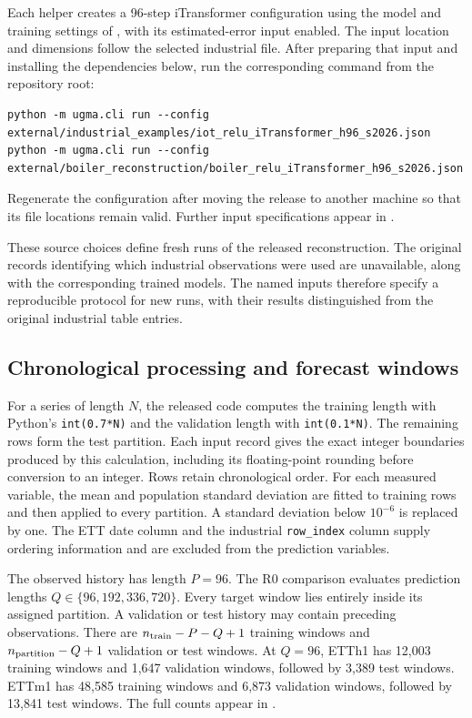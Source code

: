 Each helper creates a 96-step iTransformer configuration using the model and training settings of , with its estimated-error input enabled. The input location and dimensions follow the selected industrial file. After preparing that input and installing the dependencies below, run the corresponding command from the repository root:
\begin{lstlisting}
python -m ugma.cli run --config external/industrial_examples/iot_relu_iTransformer_h96_s2026.json
python -m ugma.cli run --config external/boiler_reconstruction/boiler_relu_iTransformer_h96_s2026.json
\end{lstlisting}
Regenerate the configuration after moving the release to another machine so that its file locations remain valid. Further input specifications appear in .

These source choices define fresh runs of the released reconstruction. The original records identifying which industrial observations were used are unavailable, along with the corresponding trained models. The named inputs therefore specify a reproducible protocol for new runs, with their results distinguished from the original industrial table entries.

\subsection*{Chronological processing and forecast windows}
For a series of length $N$, the released code computes the training length with Python's \texttt{int(0.7*N)} and the validation length with \texttt{int(0.1*N)}. The remaining rows form the test partition. Each input record gives the exact integer boundaries produced by this calculation, including its floating-point rounding before conversion to an integer. Rows retain chronological order. For each measured variable, the mean and population standard deviation are fitted to training rows and then applied to every partition. A standard deviation below $10^{-6}$ is replaced by one. The ETT date column and the industrial \texttt{row\_index} column supply ordering information and are excluded from the prediction variables.

The observed history has length $P=96$. The R0 comparison evaluates prediction lengths $Q\in\{96,192,336,720\}$. Every target window lies entirely inside its assigned partition. A validation or test history may contain preceding observations. There are $n_{\rm train}-P-Q+1$ training windows and $n_{\rm partition}-Q+1$ validation or test windows. At $Q=96$, ETTh1 has 12,003 training windows and 1,647 validation windows, followed by 3,389 test windows. ETTm1 has 48,585 training windows and 6,873 validation windows, followed by 13,841 test windows. The full counts appear in .

